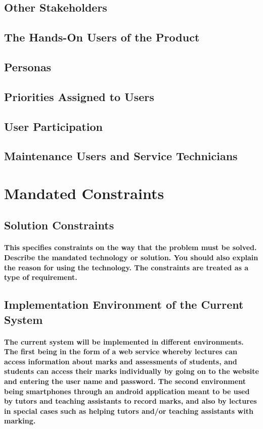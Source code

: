 \documentclass[12pt,a4paper]{article}
\begin{document}
\subsection{Other Stakeholders}
\subsection{The Hands-On Users of the Product}
\subsection{Personas}
\subsection{Priorities Assigned to Users}
\subsection{User Participation}
\subsection{Maintenance Users and Service Technicians}
\pagebreak
\section{Mandated Constraints}
\subsection{Solution Constraints}
\paragraph{
This specifies constraints on the way that the problem must be solved. Describe the mandated technology or solution. You should also explain the reason for using the technology. The constraints are treated as a type of requirement.}
\subsection{Implementation Environment of the Current System}
\paragraph{The current system will be implemented in different environments. The first being in the form of a web service whereby lectures can access information about marks and assessments of students, and students can access their marks individually by going on to the website and entering the user name and password.
The second environment being smartphones through an android application meant to be used by tutors and teaching assistants to record marks, and also by lectures in special cases such as helping tutors and/or teaching assistants with marking.}
\end{document}
